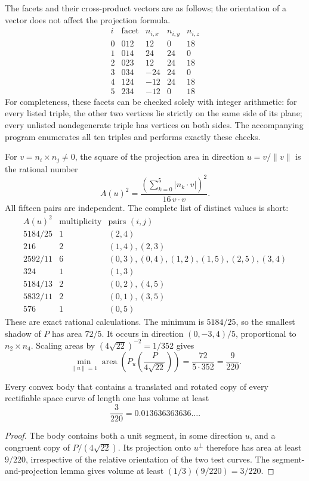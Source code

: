 The facets and their cross-product vectors are as follows; the orientation
of a vector does not affect the projection formula.
\[
\begin{array}{c|c|rrr}
i&\text{facet}&n_{i,x}&n_{i,y}&n_{i,z}\\\hline
0&012&12&0&18\\
1&014&24&24&0\\
2&023&12&24&18\\
3&034&-24&24&0\\
4&124&-12&24&18\\
5&234&-12&0&18
\end{array}
\]
For completeness, these facets can be checked solely with integer
arithmetic: for every listed triple, the other two vertices lie strictly
on the same side of its plane; every unlisted nondegenerate triple has
vertices on both sides.  The accompanying program enumerates all ten
triples and performs exactly these checks.

For $v=n_i\times n_j\ne0$, the square of the projection area in direction
$u=v/\|v\|$ is the rational number
\[
 A(u)^2=
 \frac{\left(\sum_{k=0}^{5}|n_k\cdot v|\right)^2}{16\,v\cdot v}.
\]
All fifteen pairs are independent.  The complete list of distinct
values is short:
\[
\begin{array}{c|c|l}
A(u)^2&\text{multiplicity}&\text{pairs }(i,j)\\\hline
5184/25&1&(2,4)\\
216&2&(1,4),(2,3)\\
2592/11&6&(0,3),(0,4),(1,2),(1,5),(2,5),(3,4)\\
324&1&(1,3)\\
5184/13&2&(0,2),(4,5)\\
5832/11&2&(0,1),(3,5)\\
576&1&(0,5)
\end{array}
\]
These are exact rational calculations.  The minimum is $5184/25$,
so the smallest shadow of $P$ has area $72/5$.  It occurs in direction
$(0,-3,4)/5$, proportional to $n_2\times n_4$.
Scaling areas by $(4\sqrt{22})^{-2}=1/352$ gives
\[
 \min_{\|u\|=1}\operatorname{area}
 \left(P_u\left(\frac{P}{4\sqrt{22}}\right)\right)
 =\frac{72}{5\cdot352}=\frac9{220}.
\]

\begin{theorem}
Every convex body that contains a translated and rotated copy of every
rectifiable space curve of length one has volume at least
\[
 \boxed{\frac3{220}=0.013636363636\ldots.}
\]
\end{theorem}
\begin{proof}
The body contains both a unit segment, in some direction $u$, and a
congruent copy of $P/(4\sqrt{22})$.  Its projection onto $u^\perp$
therefore has area at least $9/220$, irrespective of the relative
orientation of the two test curves.  The segment-and-projection lemma
gives volume at least $(1/3)(9/220)=3/220$.
\end{proof}

